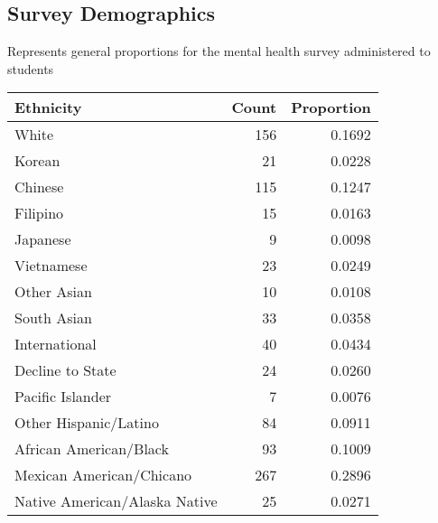 \documentclass{article}\usepackage[]{graphicx}\usepackage[]{color}
\begin{document}
\newpage

\subsection{Survey Demographics}
Represents general proportions for the mental health survey administered to students
\begin{table}[ht]
\centering
\begin{tabular}{lrr}
  \hline
Ethnicity & Count & Proportion \\ 
  \hline
                         White & 156 & 0.1692 \\ 
                          Korean & 21 & 0.0228 \\ 
                         Chinese & 115 & 0.1247 \\ 
                        Filipino & 15 & 0.0163 \\ 
                        Japanese & 9 & 0.0098 \\ 
                      Vietnamese & 23 & 0.0249 \\ 
                     Other Asian & 10 & 0.0108 \\ 
                     South Asian & 33 & 0.0358 \\ 
                   International & 40 & 0.0434 \\ 
                Decline to State & 24 & 0.0260 \\ 
                Pacific Islander & 7 & 0.0076 \\ 
           Other Hispanic/Latino & 84 & 0.0911 \\ 
          African American/Black & 93 & 0.1009 \\ 
        Mexican American/Chicano & 267 & 0.2896 \\ 
   Native American/Alaska Native & 25 & 0.0271 \\ 
   \hline
\end{tabular}
\end{table}
\end{document}

